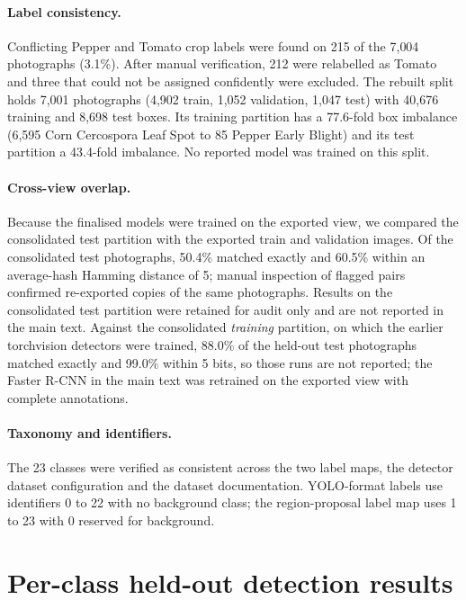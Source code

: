 \documentclass[preprint,12pt,authoryear]{elsarticle}
\begin{document}
\paragraph{Label consistency.}
Conflicting Pepper and Tomato crop labels were found on 215 of the 7{,}004 photographs (3.1\%).
After manual verification, 212 were relabelled as Tomato and three that could not be assigned confidently were excluded.
The rebuilt split holds 7{,}001 photographs (4{,}902 train, 1{,}052 validation, 1{,}047 test) with 40{,}676 training and 8{,}698 test boxes.
Its training partition has a 77.6-fold box imbalance (6{,}595 Corn Cercospora Leaf Spot to 85 Pepper Early Blight) and its test partition a 43.4-fold imbalance.
No reported model was trained on this split.

\paragraph{Cross-view overlap.}
Because the finalised models were trained on the exported view, we compared the consolidated test partition with the exported train and validation images.
Of the consolidated test photographs, 50.4\% matched exactly and 60.5\% within an average-hash Hamming distance of 5; manual inspection of flagged pairs confirmed re-exported copies of the same photographs.
Results on the consolidated test partition were retained for audit only and are not reported in the main text.
Against the consolidated \emph{training} partition, on which the earlier torchvision detectors were trained, 88.0\% of the held-out test photographs matched exactly and 99.0\% within 5 bits, so those runs are not reported; the Faster R-CNN in the main text was retrained on the exported view with complete annotations.

\paragraph{Taxonomy and identifiers.}
The 23 classes were verified as consistent across the two label maps, the detector dataset configuration and the dataset documentation.
YOLO-format labels use identifiers 0 to 22 with no background class; the region-proposal label map uses 1 to 23 with 0 reserved for background.

\section{Per-class held-out detection results}
\label{sup:perclass}
\end{document}
